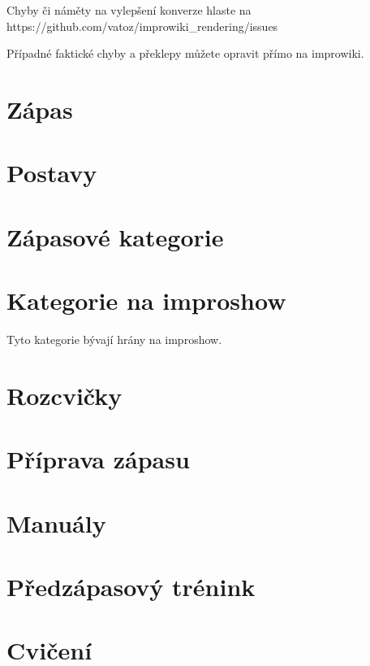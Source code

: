 \documentclass[a4paper,10pt,openany]{book}
\begin{document}
Chyby či náměty na vylepšení konverze hlaste na https://github.com/vatoz/improwiki_rendering/issues

Případné faktické chyby a překlepy můžete opravit přímo na improwiki.

\chapter{Zápas}


\chapter{Postavy}


\chapter{Zápasové kategorie}
\label{zápasové kategorie}
\label{:kategorie:zápasové kategorie}



\chapter{Kategorie na improshow}\label{další kategorie}
\label{:kategorie:kategorie na improshow}
Tyto kategorie bývají hrány na improshow.


\chapter{Rozcvičky}\label{rozcvičky}
\label{:kategorie:rozcvičky}





\chapter{Příprava zápasu}


\chapter{Manuály}


\chapter{Předzápasový trénink}


\chapter{Cvičení}

\end{document}

